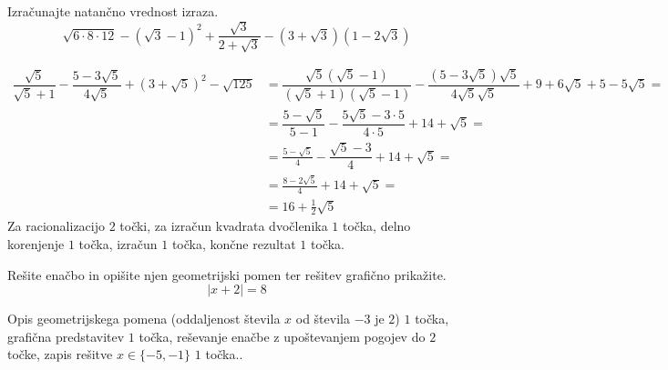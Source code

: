 \documentclass[addpoints]{exam}
\begin{document}
\begin{questions}



    \question[5]
    Izračunajte natančno vrednost izraza.
    $$ \sqrt{6\cdot 8\cdot 12}-\left(\sqrt{3}-1\right)^2+\dfrac{\sqrt{3}}{2+\sqrt{3}}-\left(3+\sqrt{3}\right)\left(1-2\sqrt{3}\right) $$

    \begin{solution}[8cm]
        \begin{align*} 
            \dfrac{\sqrt{5}}{\sqrt{5}+1}-\dfrac{5-3\sqrt{5}}{4\sqrt{5}}+\left(3+\sqrt{5}\right)^2-\sqrt{125}&=\dfrac{\sqrt{5}(\sqrt{5}-1)}{(\sqrt{5}+1)(\sqrt{5}-1)}-\dfrac{(5-3\sqrt{5})\sqrt{5}}{4\sqrt{5}\sqrt{5}}+9+6\sqrt{5}+5-5\sqrt{5}= \\
                                                                                                            &=\dfrac{5-\sqrt{5}}{5-1}-\dfrac{5\sqrt{5}-3\cdot 5}{4\cdot 5}+14+\sqrt{5}= \\
                                                                                                            &=\frac{5-\sqrt{5}}{4}-\dfrac{\sqrt{5}-3}{4}+14+\sqrt{5}= \\
                                                                                                            &=\frac{8-2\sqrt{5}}{4}+14+\sqrt{5}= \\
                                                                                                            &=16+\frac{1}{2}\sqrt{5}
        \end{align*}
        Za racionalizacijo $2$ točki, za izračun kvadrata dvočlenika $1$ točka, delno korenjenje $1$ točka, izračun $1$ točka, končne rezultat $1$ točka.
    \end{solution}
    
    

    \question[5]
    Rešite enačbo in opišite njen geometrijski pomen ter rešitev grafično prikažite.
    $$  \left\lvert x+2\right\rvert=8 $$
    
    
    \begin{solution}[5cm]
        Opis geometrijskega pomena (oddaljenost števila $x$ od števila $-3$ je $2$) $1$ točka, grafična predstavitev $1$ točka, reševanje enačbe z upoštevanjem pogojev do $2$ točke, zapis rešitve $x\in\{-5,-1\}$ $1$ točka..
    \end{solution}
        




\end{questions}
\end{document}
